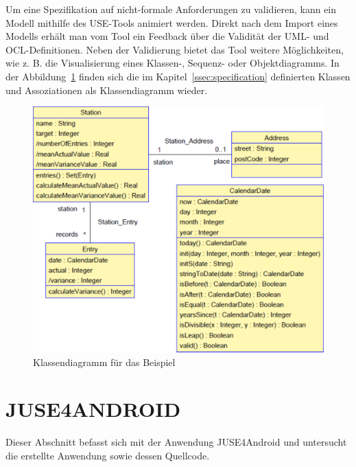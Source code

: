 \documentclass[a4paper,twoside]{article}
\begin{document}
Um eine Spezifikation auf nicht-formale Anforderungen zu validieren, kann ein Modell mithilfe des USE-Tools animiert werden. Direkt nach dem Import eines Modells erhält man vom Tool ein Feedback über die Validität der UML- und OCL-Definitionen. Neben der Validierung bietet das Tool weitere Möglichkeiten, wie z. B. die Visualisierung eines Klassen-, Sequenz- oder Objektdiagramms. In der Abbildung~\ref{fig:Grafik2} finden sich die im Kapitel~\ref{ssec:specification} definierten Klassen und Assoziationen als Klassendiagramm wieder.

\begin{figure}[!h]
	\includegraphics[scale=.325]{pics/USE_class_diagram_v2.pdf}
	\caption{Klassendiagramm für das Beispiel}
	\label{fig:Grafik2}
\end{figure}


\section{\uppercase{JUSE4Android}}
Dieser Abschnitt befasst sich mit der Anwendung JUSE4Android und untersucht die erstellte Anwendung sowie dessen Quellcode. 
\end{document}
